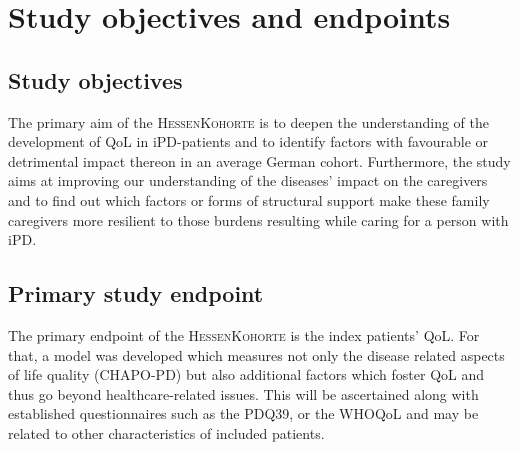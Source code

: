 \section{Study objectives and endpoints}
\subsection{Study objectives}
The primary aim of the \textsc{HessenKohorte} is to deepen the understanding of the development of \ac{QoL} in \ac{iPD}-patients and to identify factors with favourable or detrimental impact thereon in an average German cohort. Furthermore, the study aims at improving our understanding of the diseases' impact on the caregivers and to find out which factors or forms of structural support make these family caregivers more resilient to those burdens resulting while caring for a person with \ac{iPD}.

\subsection{Primary study endpoint}
The primary endpoint of the \textsc{HessenKohorte} is the index patients' \ac{QoL}. For that, a model was developed which measures not only the disease related aspects of life quality (\ac{CHAPO-PD}) but also additional factors which foster \ac{QoL} and thus go beyond healthcare-related issues. This will be ascertained along with established questionnaires such as the \ac{PDQ39}\cite{jenkinson1997pdq39}, or the \ac{WHOQoL}\cite{group1998world} and may be related to other characteristics of included patients.

